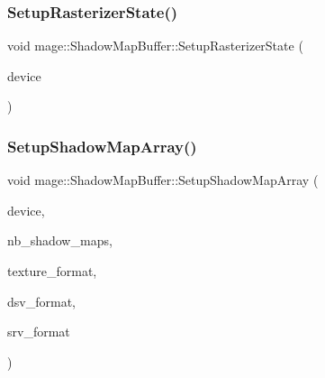 \hypertarget{structmage_1_1_shadow_map_buffer_ab36561e9927e59c99100777875f6ce3b}{}\label{structmage_1_1_shadow_map_buffer_ab36561e9927e59c99100777875f6ce3b} 
\subsubsection{\texorpdfstring{Setup\+Rasterizer\+State()}{SetupRasterizerState()}}
{\footnotesize\ttfamily void mage\+::\+Shadow\+Map\+Buffer\+::\+Setup\+Rasterizer\+State (\begin{DoxyParamCaption}\item[{I\+D3\+D11\+Device2 $\ast$}]{device }\end{DoxyParamCaption})\hspace{0.3cm}{\ttfamily [private]}}

\hypertarget{structmage_1_1_shadow_map_buffer_a6bafee84f640806c85352f77847f55ef}{}\label{structmage_1_1_shadow_map_buffer_a6bafee84f640806c85352f77847f55ef} 
\subsubsection{\texorpdfstring{Setup\+Shadow\+Map\+Array()}{SetupShadowMapArray()}}
{\footnotesize\ttfamily void mage\+::\+Shadow\+Map\+Buffer\+::\+Setup\+Shadow\+Map\+Array (\begin{DoxyParamCaption}\item[{I\+D3\+D11\+Device2 $\ast$}]{device,  }\item[{size\+\_\+t}]{nb\+\_\+shadow\+\_\+maps,  }\item[{D\+X\+G\+I\+\_\+\+F\+O\+R\+M\+AT}]{texture\+\_\+format,  }\item[{D\+X\+G\+I\+\_\+\+F\+O\+R\+M\+AT}]{dsv\+\_\+format,  }\item[{D\+X\+G\+I\+\_\+\+F\+O\+R\+M\+AT}]{srv\+\_\+format }\end{DoxyParamCaption})\hspace{0.3cm}{\ttfamily [private]}}

\hypertarget{structmage_1_1_shadow_map_buffer_a359a1174cfa0e95e8988a16343f47643}{}\label{structmage_1_1_shadow_map_buffer_a359a1174cfa0e95e8988a16343f47643} 
